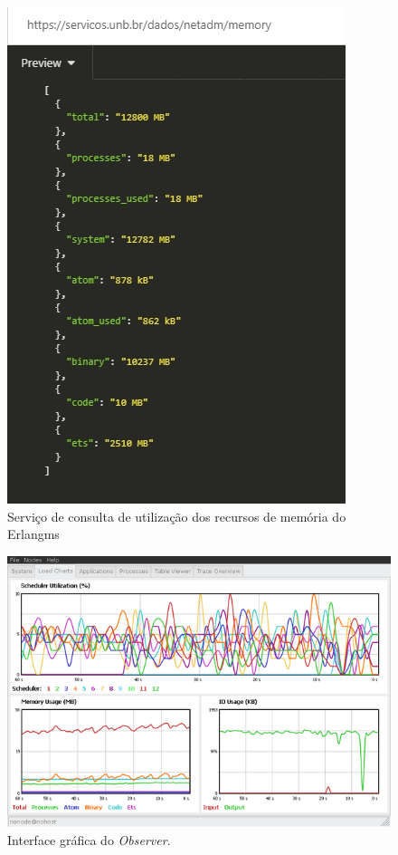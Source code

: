 \begin{figure}[h!]
	\begin{center}
	\includegraphics[scale = 0.90]{img/monitoramentoEMS.jpg}
		\caption{Serviço de consulta de utilização dos recursos de memória do Erlangms}
		\label{fun:fig:memoriaEMS}
	\end{center}
\end{figure}

\begin{figure}[h!]
	\begin{center}
	\includegraphics[scale = 0.70]{img/observerGo.jpg}
		\caption{Interface gráfica do \textit{Observer}.}
		\label{fun:fig:observer}
	\end{center}
\end{figure}

